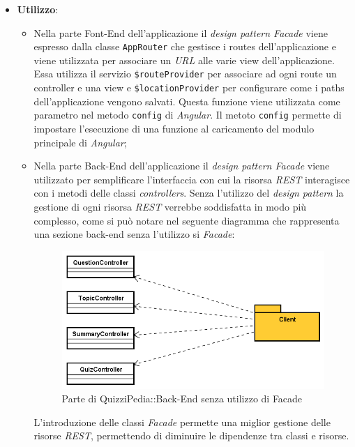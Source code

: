 \begin{itemize}
\item \textbf{Utilizzo}:
	\begin{itemize}
		\item  Nella parte Font-End dell'applicazione il \textit{design pattern Facade} viene espresso dalla classe \texttt{AppRouter} che gestisce i routes dell'applicazione e viene utilizzata per associare un \textit{URL} alle varie view dell'applicazione. Essa utilizza il servizio \texttt{\$routeProvider} per associare ad ogni route un controller e una view e \texttt{\$locationProvider} per configurare come i paths dell'applicazione vengono salvati. Questa funzione viene utilizzata come parametro nel metodo \texttt{config} di \textit{Angular}. Il metoto \texttt{config} permette di impostare l'esecuzione di una funzione al caricamento del modulo principale di \textit{Angular};
		\item Nella parte Back-End dell'applicazione il \textit{design pattern Facade} viene utilizzato per semplificare l'interfaccia con cui la risorsa \textit{REST} interagisce con i metodi delle classi \textit{controllers}.
		Senza l'utilizzo del \textit{design pattern} la gestione di ogni risorsa \textit{REST} verrebbe soddisfatta in modo più complesso, come si può notare nel seguente diagramma che rappresenta una sezione back-end senza l'utilizzo si \textit{Facade}:
		\label{Parte di QuizziPedia::Back-End senza utilizzo di Facade}
		\begin{figure} [ht]
			\centering
			\includegraphics[scale=0.50]{UML/strutturaPattern/FacadeNoUtilizzo.png}
			\caption{Parte di QuizziPedia::Back-End senza utilizzo di Facade}
		\end{figure}\FloatBarrier
		L'introduzione delle classi \textit{Facade} permette una miglior gestione delle risorse \textit{REST}, permettendo di diminuire le dipendenze tra classi e risorse.

\end{itemize}
\end{itemize}
